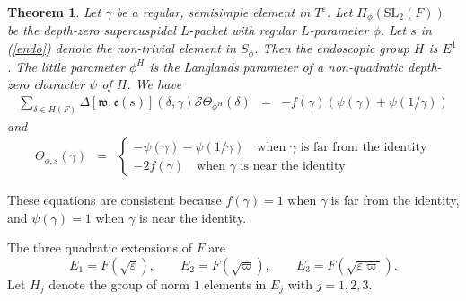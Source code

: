 \documentclass[11pt]{amsart}
\numberwithin{equation}{section}
\newtheorem{thm}[equation]{Theorem}
\def\fe{\mathfrak{e}}
\def\fw{\mathfrak{w}}
\def\SL{\mathrm{SL}}
\newcommand{\sS}{\mathscr{S}}
\newcommand{\<}{\left\langle}
\renewcommand{\>}{\right\rangle}
\begin{document}
\begin{thm}\label{A}    Let $\gamma$ be a regular, semisimple element in $T^\varepsilon$.  Let $\Pi_\phi(\SL_2(F))$ be the depth-zero supercuspidal $L$-packet with regular $L$-parameter $\phi$.    
 Let $s$ in (\ref{endo}) denote the non-trivial element in $S_\phi$.  Then the endoscopic group $H$ is $E^1$.   The little parameter $\phi^H$ is the Langlands parameter of a non-quadratic depth-zero character
 $\psi$ of $H$.   
 We have  
  \begin{eqnarray*}\label{AA}
 \sum_{\delta \in H(F)}  \Delta[\fw, \fe(s)](\delta, \gamma) \sS\Theta_{\phi^H} (\delta) 
&=&- f(\gamma)(\psi(\gamma) + \psi(1/\gamma))
\end{eqnarray*}
and
\begin{eqnarray*}
\Theta_{\phi, s}(\gamma) &=&
\begin{cases} - \psi(\gamma) - \psi(1/\gamma) \quad  \text{when $\gamma$ is far from the identity} \\
-2f(\gamma) \quad \text{when $\gamma$ is near the identity} 
\end{cases}
  \end{eqnarray*}
\end{thm}

These equations are consistent because $f(\gamma) = 1$ when $\gamma$ is far from the identity, and $\psi(\gamma) = 1$ when $\gamma$ is near the identity.   

The three quadratic extensions of $F$ are 
\[
E_1 = F(\sqrt \varepsilon),  \quad \quad E_2 = F(\sqrt \varpi), \quad \quad E_3 = F(\sqrt{\varepsilon \varpi}).
\]
Let $H_j$ denote the group of norm $1$ elements in $E_j$ with $j = 1,2,3$. 
\end{document}

